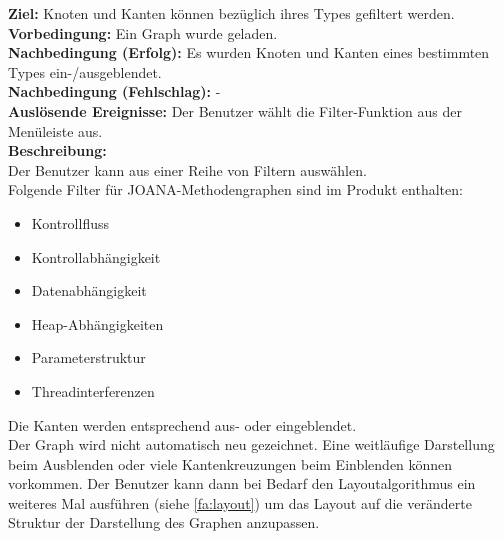 \label{fa:filter}
\textbf{Ziel:} Knoten und Kanten können bezüglich ihres Types gefiltert werden.\\
\textbf{Vorbedingung:} Ein Graph wurde geladen.\\
\textbf{Nachbedingung (Erfolg):} Es wurden Knoten und Kanten eines bestimmten Types ein-/ausgeblendet.\\
\textbf{Nachbedingung (Fehlschlag):} -\\
\textbf{Auslösende Ereignisse:}
Der Benutzer wählt die Filter-Funktion aus der Menüleiste aus.\\
\textbf{Beschreibung:}\\
Der Benutzer kann aus einer Reihe von Filtern auswählen.\\
Folgende Filter für JOANA-Methodengraphen sind im Produkt enthalten:
\begin{itemize}[nolistsep]
  \item Kontrollfluss
  \item Kontrollabhängigkeit
  \item Datenabhängigkeit
  \item Heap-Abhängigkeiten
  \item Parameterstruktur
  \item Threadinterferenzen
\end{itemize}
Die Kanten werden entsprechend aus- oder eingeblendet.\\
Der Graph wird nicht automatisch neu gezeichnet. Eine weitläufige Darstellung beim Ausblenden oder viele Kantenkreuzungen beim Einblenden können vorkommen.
Der Benutzer kann dann bei Bedarf den Layoutalgorithmus ein weiteres Mal ausführen (siehe \ref{fa:layout}) um das Layout auf die
veränderte Struktur der Darstellung des Graphen anzupassen.\\

